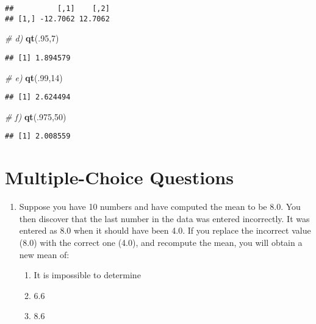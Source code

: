 \documentclass[]{article}
\newenvironment{Shaded}{\begin{snugshade}}{\end{snugshade}}
\newcommand{\KeywordTok}[1]{\textcolor[rgb]{0.13,0.29,0.53}{\textbf{#1}}}
\newcommand{\DecValTok}[1]{\textcolor[rgb]{0.00,0.00,0.81}{#1}}
\newcommand{\CommentTok}[1]{\textcolor[rgb]{0.56,0.35,0.01}{\textit{#1}}}
\newcommand{\NormalTok}[1]{#1}
\providecommand{\tightlist}{%
  \setlength{\itemsep}{0pt}\setlength{\parskip}{0pt}}
\begin{document}
\begin{verbatim}
##          [,1]    [,2]
## [1,] -12.7062 12.7062
\end{verbatim}

\begin{Shaded}
\begin{Highlighting}[]
\CommentTok{# d)}
\KeywordTok{qt}\NormalTok{(.}\DecValTok{95}\NormalTok{,}\DecValTok{7}\NormalTok{)}
\end{Highlighting}
\end{Shaded}

\begin{verbatim}
## [1] 1.894579
\end{verbatim}

\begin{Shaded}
\begin{Highlighting}[]
\CommentTok{# e)}
\KeywordTok{qt}\NormalTok{(.}\DecValTok{99}\NormalTok{,}\DecValTok{14}\NormalTok{)}
\end{Highlighting}
\end{Shaded}

\begin{verbatim}
## [1] 2.624494
\end{verbatim}

\begin{Shaded}
\begin{Highlighting}[]
\CommentTok{# f)}
\KeywordTok{qt}\NormalTok{(.}\DecValTok{975}\NormalTok{,}\DecValTok{50}\NormalTok{)}
\end{Highlighting}
\end{Shaded}

\begin{verbatim}
## [1] 2.008559
\end{verbatim}

\section{Multiple-Choice Questions}\label{multiple-choice-questions}

\begin{enumerate}
\def\labelenumi{\arabic{enumi}.}
\item
  Suppose you have 10 numbers and have computed the mean to be 8.0. You
  then discover that the last number in the data was entered
  incorrectly. It was entered as 8.0 when it should have been 4.0. If
  you replace the incorrect value (8.0) with the correct one (4.0), and
  recompute the mean, you will obtain a new mean of:

  \begin{enumerate}
  \def\labelenumii{\alph{enumii}.}
  \tightlist
  \item
    It is impossible to determine
  \item
    6.6
  \item
    8.6
  \end{enumerate}
\end{enumerate}
\end{document}
